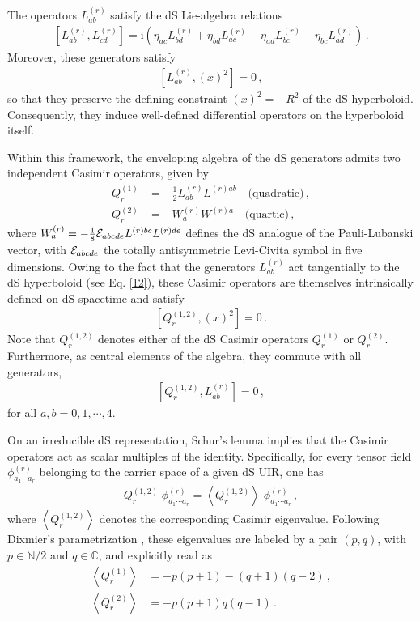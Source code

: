 \documentclass[aps,twocolumn,nofootinbib]{revtex4}
\begin{document}
The operators $L^{(r)}_{ab}$ satisfy the dS Lie-algebra relations
\begin{align}\label{adjoint commutator}
    \left[L^{(r)}_{ab},L^{(r)}_{cd}\right]
    = \mathrm{i}\left(
    \eta_{ac}L^{(r)}_{bd}
    +\eta_{bd}L^{(r)}_{ac}
    -\eta_{ad}L^{(r)}_{bc}
    -\eta_{bc}L^{(r)}_{ad}
    \right)\,.
\end{align}
Moreover, these generators satisfy 
\begin{align}\label{12}
    \left[L^{(r)}_{ab},(x)^2\right]=0\,,
\end{align}
so that they preserve the defining constraint $(x)^2=-R^2$ of the dS hyperboloid. Consequently, they induce well-defined differential operators on the hyperboloid itself.

Within this framework, the enveloping algebra of the dS generators admits two independent Casimir operators, given by
\begin{align} \label{Casimir 2}
    Q^{(1)}_r &= -\frac{1}{2}L^{(r)}_{ab}L^{(r)ab} \quad \text{(quadratic)} \,, \\[3pt]
    Q^{(2)}_r &= -W^{(r)}_a W^{(r)a} \quad \text{(quartic)} \,,
\end{align}
where $W^{(r)}_a=-\frac{1}{8}{\cal E}_{abcde} L^{(r)bc}L^{(r)de}$ defines the dS analogue of the Pauli-Lubanski vector, with ${\cal E}_{abcde}$ the totally antisymmetric Levi-Civita symbol in five dimensions. Owing to the fact that the generators $L^{(r)}_{ab}$ act tangentially to the dS hyperboloid (see Eq. \eqref{12}), these Casimir operators are themselves intrinsically defined on dS spacetime and satisfy
\begin{align}
    \left[Q^{(1,2)}_r,(x)^2\right] = 0 \,.
\end{align}
Note that $Q^{(1,2)}_r$ denotes either of the dS Casimir operators $Q^{(1)}_r$ or $Q^{(2)}_r$. Furthermore, as central elements of the algebra, they commute with all generators,
\begin{align}
    \left[Q^{(1,2)}_r,L^{(r)}_{ab}\right] = 0 \,,
\end{align}
for all $a,b=0,1,\cdots,4$.

On an irreducible dS representation, Schur's lemma implies that the Casimir operators act as scalar multiples of the identity. Specifically, for every tensor field $\phi^{(r)}_{a_1\cdots a_r}$ belonging to the carrier space of a given dS UIR, one has
\begin{align}\label{wa.eq}
    Q^{(1,2)}_r \; \phi^{(r)}_{a_1\cdots a_r} = \left\langle Q^{(1,2)}_r\right\rangle \; \phi^{(r)}_{a_1\cdots a_r} \,,
\end{align}
where $\left\langle Q^{(1,2)}_r\right\rangle$ denotes the corresponding Casimir eigenvalue. Following Dixmier's parametrization \cite{Dixmier}, these eigenvalues are labeled by a pair $(p,q)$, with $p\in\mathbb N/2$ and $q\in\mathbb C$, and explicitly read as
\begin{align}
    \label{Casimir rank 2}
    \left\langle Q^{(1)}_r\right\rangle &= -p(p+1)-(q+1)(q-2) \,, \\[3pt]
    \label{Casimir rank 4} 
    \left\langle Q^{(2)}_r\right\rangle &= -p(p+1)q(q-1) \,.
\end{align}
\end{document}
